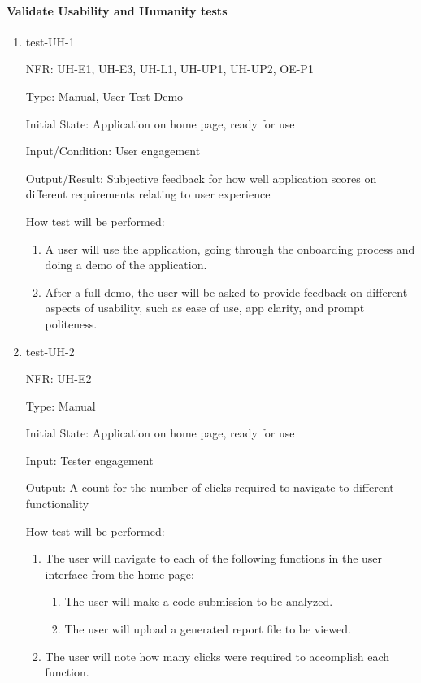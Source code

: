 \documentclass[12pt, titlepage]{article}
\begin{document}
\paragraph{Validate Usability and Humanity tests}
\begin{enumerate}

  \item{test-UH-1}
  
  NFR: UH-E1, UH-E3, UH-L1, UH-UP1, UH-UP2, OE-P1
  
  Type: Manual, User Test Demo
            
  Initial State: Application on home page, ready for use
            
  Input/Condition: User engagement
            
  Output/Result: Subjective feedback for how well application scores on different requirements relating to user experience
            
  How test will be performed: 
  \begin{enumerate}
    \item A user will use the application, going through the onboarding process
    and doing a demo of the application.
    \item After a full demo, the user will be asked to provide feedback on
    different aspects of usability, such as ease of use, app clarity, and prompt
    politeness.
  \end{enumerate}
            
  \item{test-UH-2}
  
  NFR: UH-E2
  
  Type: Manual
            
  Initial State: Application on home page, ready for use
            
  Input: Tester engagement
            
  Output: A count for the number of clicks required to navigate to different functionality
            
  How test will be performed: 
  \begin{enumerate}
    \item The user will navigate to each of the following functions in the user interface from the home page:
    \begin{enumerate}
      \item The user will make a code submission to be analyzed.
      \item The user will upload a generated report file to be viewed.
    \end{enumerate}
    \item The user will note how many clicks were required to accomplish each function.
  \end{enumerate}


\end{enumerate}
\end{document}
